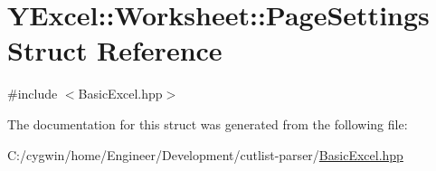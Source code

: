 \hypertarget{struct_y_excel_1_1_worksheet_1_1_page_settings}{}\section{Y\+Excel\+:\+:Worksheet\+:\+:Page\+Settings Struct Reference}
\label{struct_y_excel_1_1_worksheet_1_1_page_settings}


{\ttfamily \#include $<$Basic\+Excel.\+hpp$>$}



The documentation for this struct was generated from the following file\+:\begin{DoxyCompactItemize}
\item 
C\+:/cygwin/home/\+Engineer/\+Development/cutlist-\/parser/\hyperlink{_basic_excel_8hpp}{Basic\+Excel.\+hpp}\end{DoxyCompactItemize}
